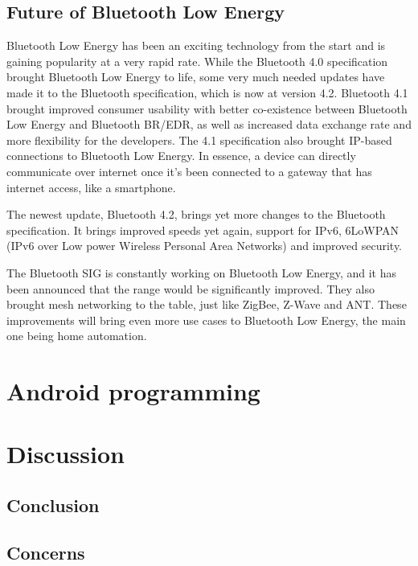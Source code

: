 \documentclass[pdftex,a4paper,12pt,twoside]{report}
\begin{document}
\section{Future of Bluetooth Low Energy}
\label{subsec:futureble}
Bluetooth Low Energy has been an exciting technology from the start and is gaining popularity at a very rapid rate. While the Bluetooth 4.0 specification brought Bluetooth Low Energy to life, some very much needed updates have made it to the Bluetooth specification, which is now at version 4.2. Bluetooth 4.1 brought improved consumer usability with better co-existence between Bluetooth Low Energy and Bluetooth BR/EDR, as well as increased data exchange rate and more flexibility for the developers. The 4.1 specification also brought IP-based connections to Bluetooth Low Energy. In essence, a device can directly communicate over internet once it's been connected to a gateway that has internet access, like a smartphone.

The newest update, Bluetooth 4.2, brings yet more changes to the Bluetooth specification. It brings improved speeds yet again, support for IPv6, 6LoWPAN (IPv6 over Low power Wireless Personal Area Networks) and improved security.

The Bluetooth SIG is constantly working on Bluetooth Low Energy, and it has been announced that the range would be significantly improved. They also brought mesh networking to the table, just like ZigBee, Z-Wave and ANT. These improvements will bring even more use cases to Bluetooth Low Energy, the main one being home automation.

\chapter{Android programming}
\label{ch:android}

\chapter{Discussion}
\label{ch:discussion}

\section{Conclusion}
\label{sec:conclusion}

\section{Concerns}
\label{sec:concerns}
\end{document}
